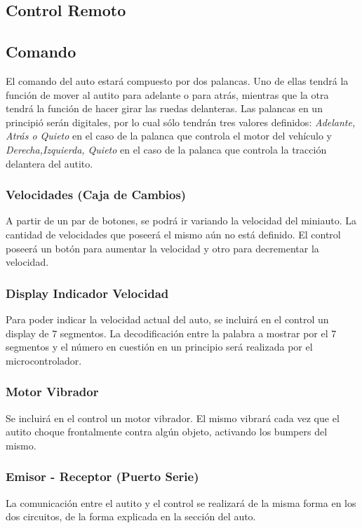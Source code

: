 \documentclass[a4paper,10pt]{article}
\begin{document}
		\subsection{Control Remoto}
			\subsection{Comando}
				El comando del auto estará compuesto por dos palancas. Uno de ellas tendrá la función de mover al autito para adelante o para atrás, mientras que la otra
				tendrá la función de hacer girar las ruedas delanteras. Las palancas en un principió serán digitales, por lo cual sólo tendrán tres valores definidos:
				\emph{Adelante, Atrás o Quieto} en el caso de la palanca que controla el motor del vehículo y \emph{Derecha,Izquierda, Quieto} en el caso de la palanca 
				que controla la tracción delantera del autito.
			\subsubsection{Velocidades (Caja de Cambios)}
				A partir de un par de botones, se podrá ir variando la velocidad del miniauto. La cantidad de velocidades que poseerá el mismo aún no está definido.
				El control poseerá un botón para aumentar la velocidad y otro para decrementar la velocidad.
			\subsubsection{Display Indicador Velocidad}
				Para poder indicar la velocidad actual del auto, se incluirá en el control un display de 7 segmentos. La decodificación entre la palabra a mostrar
				por el 7 segmentos y el número en cuestión en un principio será realizada por el microcontrolador. 
			\subsubsection{Motor Vibrador}
				Se incluirá en el control un motor vibrador. El mismo vibrará cada vez que el autito choque frontalmente contra algún objeto, activando los bumpers
				del mismo. 
			\subsubsection{Emisor - Receptor (Puerto Serie)}
				La comunicación entre el autito y el control se realizará de la misma forma en los dos circuitos, de la forma explicada en la sección del auto.
\end{document}
